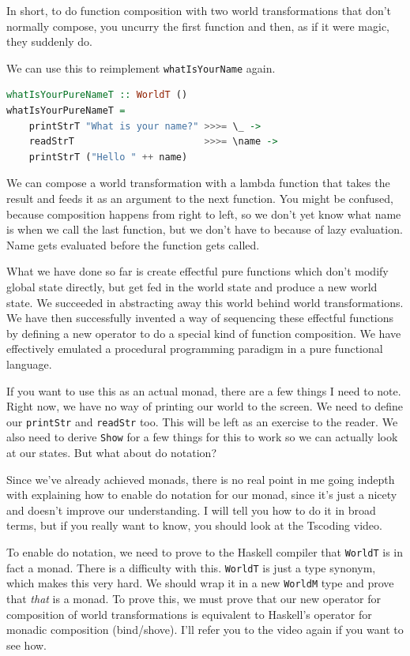 \documentclass[11pt]{article}
\begin{document}
In short, to do function composition with two world transformations that don't
normally compose, you uncurry the first function and then, as if it were magic,
they suddenly do.

We can use this to reimplement \texttt{whatIsYourName} again.
\begin{lstlisting}[language=Haskell]
whatIsYourPureNameT :: WorldT ()
whatIsYourPureNameT =
    printStrT "What is your name?" >>>= \_ ->
    readStrT                       >>>= \name ->
    printStrT ("Hello " ++ name)
\end{lstlisting}
We can compose a world transformation with a lambda function that takes the result
and feeds it as an argument to the next function. You might be confused,
because composition happens from right to left, so we don't yet know what name
is when we call the last function, but we don't have to because of lazy
evaluation. Name gets evaluated before the function gets called.

What we have done so far is create effectful pure functions which don't modify
global state directly, but get fed in the world state and produce a new world
state. We succeeded in abstracting away this world behind world
transformations. We have then successfully invented a way of sequencing these
effectful functions by defining a new operator to do a special kind of function
composition. We have effectively emulated a procedural programming paradigm in
a pure functional language.

If you want to use this as an actual monad, there are a few things I need to
note. Right now, we have no way of printing our world to the screen. We need to
define our \texttt{printStr} and \texttt{readStr} too. This will be left as an
exercise to the reader. We also need to derive \texttt{Show} for a few things
for this to work so we can actually look at our states. But what about do
notation?

Since we've already achieved monads, there is no real point in me going indepth
with explaining how to enable do notation for our monad, since it's just a
nicety and doesn't improve our understanding. I will tell you how to do it in
broad terms, but if you really want to know, you should look at the Tscoding
video.


To enable do notation, we need to prove to the Haskell compiler that
\texttt{WorldT} is in fact a monad. There is a difficulty with this.
\texttt{WorldT} is just a type synonym, which makes this very hard. We should
wrap it in a new \texttt{WorldM} type and prove that \emph{that} is a monad. To
prove this, we must prove that our new operator for composition of world
transformations is equivalent to Haskell's operator for monadic composition
(bind/shove). I'll refer you to the video again if you want to see how.
\end{document}
